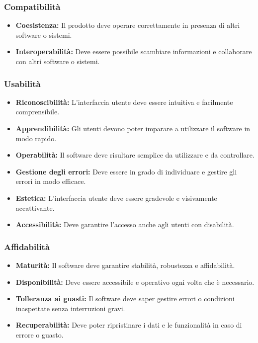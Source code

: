 \subsubsection{Compatibilità}
\begin{itemize}
    \item \textbf{Coesistenza:} Il prodotto deve operare correttamente in presenza di altri software o sistemi.
    \item \textbf{Interoperabilità:} Deve essere possibile scambiare informazioni e collaborare con altri software o sistemi.
\end{itemize}

\subsubsection{Usabilità}
\begin{itemize}
    \item \textbf{Riconoscibilità:} L’interfaccia utente deve essere intuitiva e facilmente comprensibile.
    \item \textbf{Apprendibilità:} Gli utenti devono poter imparare a utilizzare il software in modo rapido.
    \item \textbf{Operabilità:} Il software deve risultare semplice da utilizzare e da controllare.
    \item \textbf{Gestione degli errori:} Deve essere in grado di individuare e gestire gli errori in modo efficace.
    \item \textbf{Estetica:} L’interfaccia utente deve essere gradevole e visivamente accattivante.
    \item \textbf{Accessibilità:} Deve garantire l’accesso anche agli utenti con disabilità.
\end{itemize}

\subsubsection{Affidabilità}
\begin{itemize}
    \item \textbf{Maturità:} Il software deve garantire stabilità, robustezza e affidabilità.
    \item \textbf{Disponibilità:} Deve essere accessibile e operativo ogni volta che è necessario.
    \item \textbf{Tolleranza ai guasti:} Il software deve saper gestire errori o condizioni inaspettate senza interruzioni gravi.
    \item \textbf{Recuperabilità:} Deve poter ripristinare i dati e le funzionalità in caso di errore o guasto.
\end{itemize}

